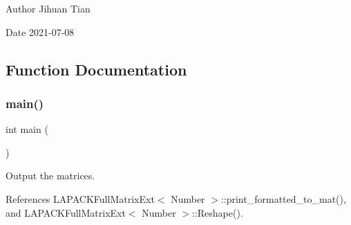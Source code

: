 \begin{DoxyAuthor}{Author}
Jihuan Tian 
\end{DoxyAuthor}
\begin{DoxyDate}{Date}
2021-\/07-\/08 
\end{DoxyDate}


\subsection{Function Documentation}
\mbox{\label{lapack-matrix-agglomeration_8cc_ae66f6b31b5ad750f1fe042a706a4e3d4}} 
\subsubsection{\texorpdfstring{main()}{main()}}
{\footnotesize\ttfamily int main (\begin{DoxyParamCaption}{ }\end{DoxyParamCaption})}

Output the matrices.

References L\+A\+P\+A\+C\+K\+Full\+Matrix\+Ext$<$ Number $>$\+::print\+\_\+formatted\+\_\+to\+\_\+mat(), and L\+A\+P\+A\+C\+K\+Full\+Matrix\+Ext$<$ Number $>$\+::\+Reshape().

